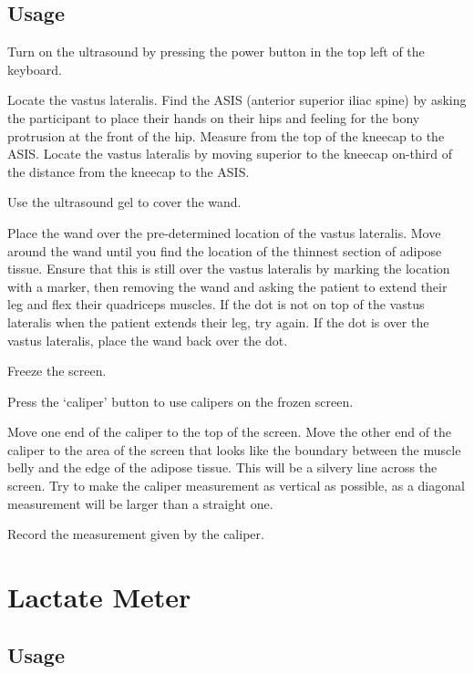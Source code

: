 \documentclass[
]{book}
\begin{document}
\hypertarget{Appendix-Instruments-Ultrasound-Usage}{%
\subsection{Usage}\label{Appendix-Instruments-Ultrasound-Usage}}

Turn on the ultrasound by pressing the power button in the top left of the keyboard.

Locate the vastus lateralis. Find the ASIS (anterior superior iliac spine) by asking the participant to place their hands on their hips and feeling for the bony protrusion at the front of the hip. Measure from the top of the kneecap to the ASIS. Locate the vastus lateralis by moving superior to the kneecap on-third of the distance from the kneecap to the ASIS.

Use the ultrasound gel to cover the wand.

Place the wand over the pre-determined location of the vastus lateralis. Move around the wand until you find the location of the thinnest section of adipose tissue. Ensure that this is still over the vastus lateralis by marking the location with a marker, then removing the wand and asking the patient to extend their leg and flex their quadriceps muscles. If the dot is not on top of the vastus lateralis when the patient extends their leg, try again. If the dot is over the vastus lateralis, place the wand back over the dot.

Freeze the screen.

Press the `caliper' button to use calipers on the frozen screen.

Move one end of the caliper to the top of the screen. Move the other end of the caliper to the area of the screen that looks like the boundary between the muscle belly and the edge of the adipose tissue. This will be a silvery line across the screen. Try to make the caliper measurement as vertical as possible, as a diagonal measurement will be larger than a straight one.

Record the measurement given by the caliper.

\hypertarget{Appendix-Instruments-LactateMeter}{%
\section{Lactate Meter}\label{Appendix-Instruments-LactateMeter}}

\hypertarget{Appendix-Instruments-LactateMeter-Usage}{%
\subsection{Usage}\label{Appendix-Instruments-LactateMeter-Usage}}
\end{document}
